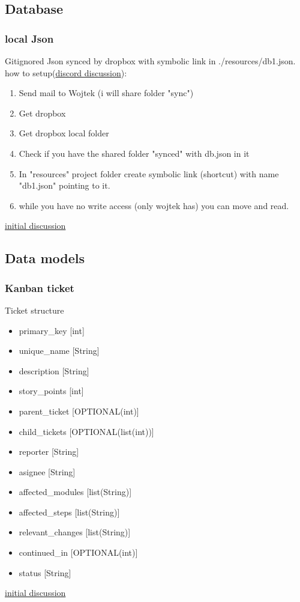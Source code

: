 \subsection{Database}\label{DB:POC}
\subsubsection{local Json}
Gitignored Json synced by dropbox with symbolic link in ./resources/db1.json.\\
how to setup(\href{https://discord.com/channels/892473074434310144/895768675146154004/895772874613346354}{discord discussion}):
\begin{enumerate}
    \item Send mail to Wojtek (i will share folder "sync")
    \item Get dropbox
    \item Get dropbox local folder
    \item Check if you have the shared folder "synced" with db.json in it
    \item In "resources" project folder create symbolic link (shortcut) with name "db1.json" pointing to it.
    \item while you have no write access (only wojtek has) you can move and read.
\end{enumerate}

\href{https://discord.com/channels/892473074434310144/892481179624824843}{initial discussion}

\subsection{Data models}\label{MODEL:POC}
\subsubsection{Kanban ticket}
Ticket structure
\begin{itemize}
  \item primary\_key        [int]
  \item unique\_name        [String]
  \item description         [String]
  \item story\_points       [int]
  \item parent\_ticket      [OPTIONAL(int)]
  \item child\_tickets      [OPTIONAL(list(int))]
  \item reporter            [String]
  \item asignee             [String]
  \item affected\_modules   [list(String)]
  \item affected\_steps     [list(String)]
  \item relevant\_changes   [list(String)]
  \item continued\_in       [OPTIONAL(int)]
  \item status              [String]
\end{itemize}
\href{https://discord.com/channels/892473074434310144/892483718495731753}{initial discussion}

